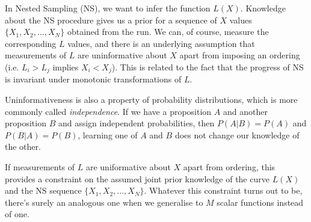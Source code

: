 \documentclass[a4paper, 11pt]{article}
\title{}
\author{}
\begin{document}
\maketitle

In Nested Sampling (NS), we want to infer the function $L(X)$.
Knowledge about the NS procedure gives us a prior for a sequence of $X$ values
$\{X_1, X_2, ..., X_N\}$
obtained from the run. We can, of course, measure the corresponding $L$
values, and there is an underlying assumption that measurements of $L$ are
uninformative about $X$ apart from imposing an ordering
(i.e. $L_i > L_j$ implies $X_i < X_j$). This is related to the fact that the
progress of NS is invariant under monotonic transformations of $L$.

Uninformativeness is also a property of probability distributions, which
is more commonly called {\it independence}. If we have a proposition $A$ and
another proposition $B$ and assign independent probabilities, then
$P(A|B) = P(A)$ and $P(B|A) = P(B)$, learning one of $A$ and $B$
does not change our knowledge of the other.

If measurements of $L$ are uniformative about $X$ apart from ordering, this
provides a constraint on the assumed joint prior knowledge of the curve
$L(X)$ and the NS sequence $\{X_1, X_2, ..., X_N\}$. Whatever this constraint
turns out to be, there's surely an analogous one when we generalise to
$M$ scalar functions instead of one.
\end{document}
